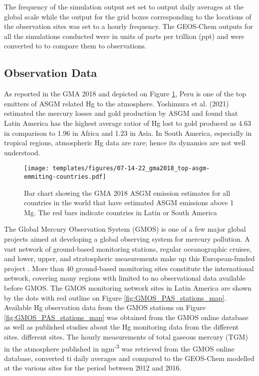 \begin{flushleft}

 The frequency of the simulation output set set to output daily \hg averages at the global scale while the \hg output for the grid boxes corresponding to the locations of the observation sites was set to a hourly frequency. The GEOS-Chem outputs for all the simulations conducted were in units of parts per trillion (ppt) and were converted to \ng to compare them to observations.
\end{flushleft}

\subsection{Observation Data}
\begin{flushleft}
As reported in the GMA 2018 and depicted on Figure \ref{fig:Latam_Hg_em}, Peru is one of the top emitters of ASGM related Hg \cite{united_nations_environment_programme_technical_2019} to the atmosphere. Yoshimura et al. (2021) estimated the mercury losses and gold production by ASGM and found that Latin America has the highest average ratior of Hg lost to gold produced as 4.63 in comparison to 1.96 in Africa and 1.23 in Asia. In South America, especially in tropical regions, atmospheric Hg data are rare; hence its dynamics are not well understood. 
\end{flushleft}
\begin{figure}[H]
  \texttt{[image: templates/figures/07-14-22\_gma2018\_top-asgm-emmiting-countries.pdf]}
  \centering
  \caption{Bar chart showing the GMA 2018 ASGM \hg emission estimates for all countries in the world that have estimated ASGM \hg emissions above 1 Mg. The red bars indicate countries in Latin or South America }
  \label{fig:Latam_Hg_em}
\end{figure}
\FloatBarrier



\begin{flushleft}
 The Global Mercury Observation System (GMOS) is one of a few major global projects aimed at developing a global observing system for mercury pollution. A vast network of ground-based monitoring stations, regular oceanographic cruises, and lower, upper, and stratospheric measurements make up this European-funded project \cite{sprovieri_atmospheric_2016} \cite{koenig_seasonal_2021}. More than 40 ground-based monitoring sites constitute the international network, covering many regions with limited to no observational data available before GMOS. The GMOS monitoring network sites in Latin America are shown by the dots with red outline on Figure \ref{fig:GMOS_PAS_stations_map}. Available Hg observation data from the GMOS stations on Figure  \ref{fig:GMOS_PAS_stations_map} was obtained from the GMOS online database as well as published studies about the Hg monitoring data from the different sites. different sites\cite{koenig_seasonal_2021}. The hourly measurements of total gaseous mercury (TGM) in the atmosphere published in ngm\textsuperscript{-3} was retrieved from the GMOS online database, converted ti daily averages and compared to the GEOS-Chem modelled \hg at the various sites for the period between 2012 and 2016. 
\end{flushleft}

